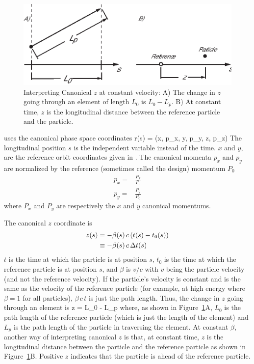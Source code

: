 \begin{figure}
\centering 
\includegraphics{canonical-z.eps} 
\caption[Interpreting Canonical $z$ at constant velocity.]
{Interpreting Canonical $z$ at constant velocity: A) The change in $z$
going through an element of length $L_0$ is $L_0 - L_p$.  B) At
constant time, $z$ is the longitudinal distance between the reference
particle and the particle.}
\label{f:canonical.z}
\end{figure}

\bmad uses the canonical phase space coordinates 
\Begineq
  \Bf r(s) = (x, p_x, y, p_y, z, p_z)
\Endeq
The longitudinal position $s$ is the independent variable instead of
the time.  $x$ and $y$, are the reference orbit coordinates given in
.  The canonical momenta $p_x$ and $p_y$ are
normalized by the reference (sometimes called the
design) momentum $P_0$
\begin{align}
  p_x = &\frac{P_x}{P_0} \\
  p_y = &\frac{P_y}{P_0}
\end{align}
where $P_x$ and $P_y$ are respectively the $x$ and $y$ canonical momentums.

The canonical $z$ coordinate is 
\begin{align}
  z(s) &= -\beta(s) \, c \, (t(s) - t_0(s)) \nonumber \\
    &\equiv - \beta(s) \, c \, \Delta t(s)
  \label{zbctt}
\end{align}
$t$ is the time at which the particle is at position $s$, $t_0$ is the
time at which the reference particle is at position $s$, and $\beta$ is
$v/c$ with $v$ being the particle velocity (and not the reference velocity). 
If the particle's velocity is constant and is the same as the 
velocity of the reference particle
(for example, at high energy where $\beta = 1$ for all particles), 
$\beta \, c \, t$ is just the path length. Thus, the change in
$z$ going through an element is
\Begineq
  \Delta z = L_0 - L_p
\Endeq
where, as shown in Figure~\ref{f:canonical.z}A, $L_0$ is the path
length of the reference particle (which is just the length of the
element) and $L_p$ is the path length of the particle in traversing the
element. At constant $\beta$, another way of interpreting canonical $z$
is that, at constant time, $z$ is the longitudinal distance between the
particle and the reference particle as shown in
Figure~\ref{f:canonical.z}B. Positive $z$ indicates that the particle
is ahead of the reference particle.

